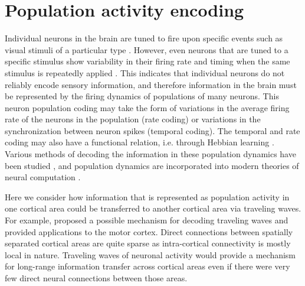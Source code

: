 
\chapter{Population activity encoding }

Individual neurons in the brain are tuned to fire upon specific events such as visual stimuli of a particular type \citep{Hubel1962} .
However, even neurons that are tuned to a specific stimulus show variability in their firing rate and timing when the same stimulus is repeatedly applied \citep{Georgopoulos1982}\citep{Newsome1989}.
This indicates that individual neurons do not reliably encode sensory information, and therefore information in the brain must be represented by the firing dynamics of populations of many neurons.
This neuron population coding may take the form of variations in the average firing rate of the neurons in the population (rate coding) or variations in the synchronization between neuron spikes (temporal coding).
The temporal and rate coding may also have a functional relation, i.e. through Hebbian learning \citep{Basawaraj2019}.
Various methods of decoding the information in these population dynamics have been studied \citep{Deneve1999}\citep{Xu2019}, 
and population dynamics are incorporated into modern theories of neural computation \citep{Pitkow2017}\citep{Nadeau2020}.

Here we consider how information that is represented as population activity in one cortical area could be transferred to another cortical area via traveling waves.
For example, \citet{Heitmann2013} proposed a possible mechanism for decoding traveling waves and provided applications to the motor cortex.
Direct connections between spatially separated cortical areas are quite sparse\citep{Markov2011} as intra-cortical connectivity is mostly local in nature.
Traveling waves of neuronal activity would provide a mechanism for long-range information transfer across cortical areas 
even if there were very few direct neural connections between those areas.


